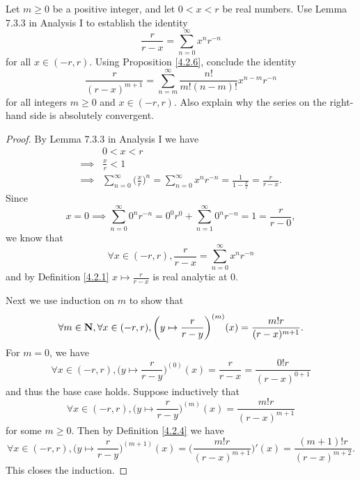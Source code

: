\begin{exercise}\label{ex 4.2.7}
    Let \(m \geq 0\) be a positive integer, and let \(0 < x < r\) be real numbers.
    Use Lemma 7.3.3 in Analysis I to establish the identity
    \[
        \frac{r}{r - x} = \sum_{n = 0}^\infty x^n r^{-n}
    \]
    for all \(x \in (-r, r)\).
    Using Proposition \ref{4.2.6}, conclude the identity
    \[
        \frac{r}{(r - x)^{m + 1}} = \sum_{n = m}^\infty \frac{n!}{m! (n - m)!} x^{n - m} r^{-n}
    \]
    for all integers \(m \geq 0\) and \(x \in (-r, r)\).
    Also explain why the series on the right-hand side is absolutely convergent.
\end{exercise}

\begin{proof}
    By Lemma 7.3.3 in Analysis I we have
    \begin{align*}
                 & 0 < x < r                                                                                                                     \\
        \implies & \frac{x}{r} < 1                                                                                                               \\
        \implies & \sum_{n = 0}^\infty \bigg(\frac{x}{r}\bigg)^n = \sum_{n = 0}^\infty x^n r^{-n} = \frac{1}{1 - \frac{x}{r}} = \frac{r}{r - x}.
    \end{align*}
    Since
    \[
        x = 0 \implies \sum_{n = 0}^\infty 0^n r^{-n} = 0^0 r^{0} + \sum_{n = 1}^\infty 0^n r^{-n} = 1 = \frac{r}{r - 0},
    \]
    we know that
    \[
        \forall x \in (-r, r), \frac{r}{r - x} = \sum_{n = 0}^\infty x^n r^{-n}
    \]
    and by Definition \ref{4.2.1} \(x \mapsto \frac{r}{r - x}\) is real analytic at \(0\).

    Next we use induction on \(m\) to show that
    \[
        \forall m \in \mathbf{N}, \forall x \in (-r, r), \bigg(y \mapsto \frac{r}{r - y}\bigg)^{(m)}(x) = \frac{m! r}{(r - x)^{m + 1}}.
    \]
    For \(m = 0\), we have
    \[
        \forall x \in (-r, r), \bigg(y \mapsto \frac{r}{r - y}\bigg)^{(0)}(x) = \frac{r}{r - x} = \frac{0! r}{(r - x)^{0 + 1}}
    \]
    and thus the base case holds.
    Suppose inductively that
    \[
        \forall x \in (-r, r), \bigg(y \mapsto \frac{r}{r - y}\bigg)^{(m)}(x) = \frac{m! r}{(r - x)^{m + 1}}
    \]
    for some \(m \geq 0\).
    Then by Definition \ref{4.2.4} we have
    \[
        \forall x \in (-r, r), \bigg(y \mapsto \frac{r}{r - y}\bigg)^{(m + 1)}(x) = \bigg(\frac{m! r}{(r - x)^{m + 1}}\bigg)'(x) = \frac{(m + 1)! r}{(r - x)^{m + 2}}.
    \]
    This closes the induction.


\end{proof}
